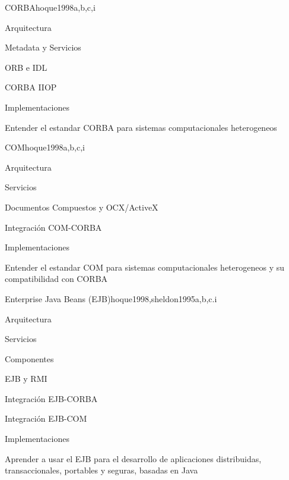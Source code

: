 \begin{syllabus}
\begin{unit}{CORBA}{hoque1998}{a,b,c,i}
   \begin{topics}
      \item Arquitectura
      \item Metadata y Servicios
      \item ORB e IDL
      \item CORBA IIOP
      \item Implementaciones
   \end{topics}

   \begin{unitgoals}
      \item Entender el estandar CORBA para sistemas computacionales heterogeneos
   \end{unitgoals}
\end{unit}

\begin{unit}{COM}{hoque1998}{a,b,c,i}
   \begin{topics}
      \item Arquitectura
      \item Servicios
      \item Documentos Compuestos y OCX/ActiveX
      \item Integración COM-CORBA
      \item Implementaciones
   \end{topics}

   \begin{unitgoals}
      \item  Entender el estandar COM para sistemas computacionales heterogeneos y su compatibilidad con CORBA
   \end{unitgoals}
\end{unit}

\begin{unit}{Enterprise Java Beans (EJB)}{hoque1998,sheldon1995}{a,b,c.i}
   \begin{topics}
      \item Arquitectura
      \item Servicios
      \item Componentes
      \item EJB y RMI
      \item Integración EJB-CORBA
      \item Integración EJB-COM
      \item Implementaciones
   \end{topics}

   \begin{unitgoals}
      \item Aprender a usar el EJB para el desarrollo de aplicaciones distribuidas, transaccionales, portables y seguras, basadas en Java
   \end{unitgoals}
\end{unit}


\end{syllabus}
